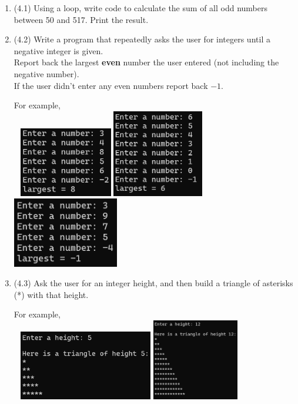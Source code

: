 \documentclass{article}
\begin{document}
\begin{enumerate}
\item (4.1)  
		Using a loop, write code to calculate the sum of all odd numbers between 50 and 517. 
		Print the result.


\item (4.2)  
		Write a program that repeatedly asks the user for integers until a negative integer is 
		given.\\  Report back the largest \textbf{even} number the user entered 
		(not including the negative number).  \\
		If the user didn't enter any even numbers report back $-1$.

		For example, \\ \ \hfill
		\includegraphics[height = 1.2in]{./imgs/largestEven1.PNG} \hfill  
		\includegraphics[height = 1.5in]{./imgs/largestEven2.PNG} \hfill  
		\includegraphics[height = 1.2in]{./imgs/largestEven3.PNG} \hfill \


\item (4.3)  
		Ask the user for an integer height, and then build a triangle of asterisks (*) 
		with that height.

		For example, \\ \ \hfill
		\includegraphics[height = 1.2in]{./imgs/triangle1.PNG} \hfill  
		\includegraphics[height = 1.4in]{./imgs/triangle2.PNG} \hfill  \


\end{enumerate}
\end{document}
